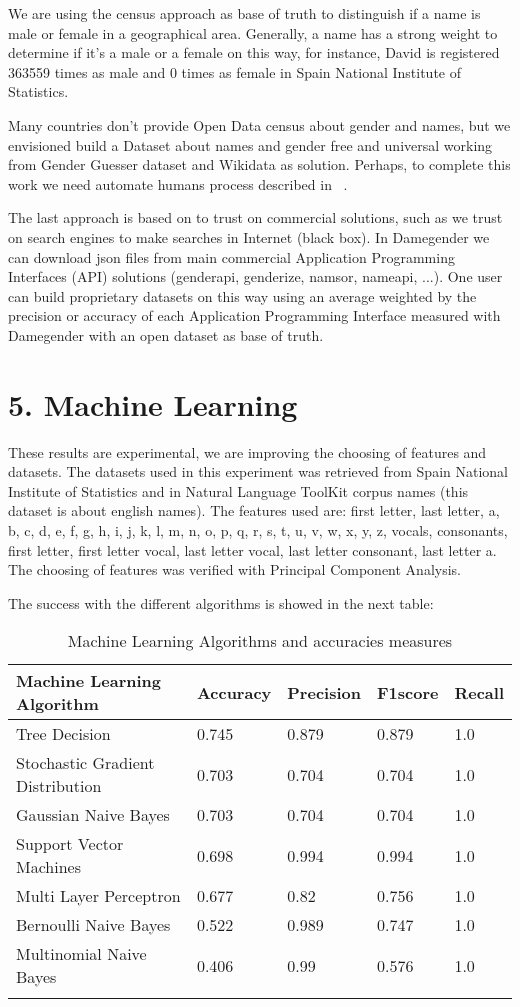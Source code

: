 \documentclass[fleqn,10pt,lineno]{wlpeerj} %
\begin{document}
We are using the census approach as base of truth to distinguish if a
name is male or female in a geographical area. Generally, a name has a
strong weight to determine if it's a male or a female on this way, for
instance, David is registered 363559 times as male and 0 times as
female in Spain National Institute of Statistics.

Many countries don't provide Open Data census about gender and names,
but we envisioned build a Dataset about names and gender free and
universal working from Gender Guesser dataset and Wikidata as
solution. Perhaps, to complete this work we need automate humans
process described in ~\cite{10.7717/peerj-cs.156}.

The last approach is based on to trust on commercial solutions, such
as we trust on search engines to make searches in Internet (black
box).  In Damegender we can download json files from main commercial
Application Programming Interfaces (API) solutions (genderapi,
genderize, namsor, nameapi, ...). One user can build proprietary
datasets on this way using an average weighted by the precision or
accuracy of each Application Programming Interface measured with
Damegender with an open dataset as base of truth.

\section{5. Machine Learning}

These results are experimental, we are improving the choosing of
features and datasets. The datasets used in this experiment was
retrieved from Spain National Institute of Statistics and in Natural
Language ToolKit corpus names (this dataset is about english
names). The features used are: first letter, last letter, a, b, c, d,
e, f, g, h, i, j, k, l, m, n, o, p, q, r, s, t, u, v, w, x, y, z,
vocals, consonants, first letter, first letter vocal, last letter
vocal, last letter consonant, last letter a. The choosing of features
was verified with Principal Component Analysis.

The success with the different algorithms is showed in the next table:

\begin{longtable}[]{@{}lllll@{}}
  \toprule
  Machine Learning Algorithm & Accuracy & Precision & F1score & Recall \tabularnewline
  \midrule
  \endhead
  Tree Decision & 0.745 & 0.879 & 0.879 & 1.0 & \tabularnewline
  Stochastic Gradient Distribution & 0.703 & 0.704 & 0.704 & 1.0 & \tabularnewline
  Gaussian Naive Bayes & 0.703 & 0.704 & 0.704 & 1.0 & \tabularnewline
  Support Vector Machines & 0.698 & 0.994 & 0.994 & 1.0 & \tabularnewline
  Multi Layer Perceptron & 0.677 & 0.82 & 0.756 & 1.0 & \tabularnewline
  Bernoulli Naive Bayes & 0.522 & 0.989 & 0.747 & 1.0 & \tabularnewline
  Multinomial Naive Bayes & 0.406 & 0.99 & 0.576 & 1.0 & \tabularnewline
\bottomrule
\caption{Machine Learning Algorithms and accuracies measures}
\label{table:MLAccuracies}
\end{longtable}
\end{document}
